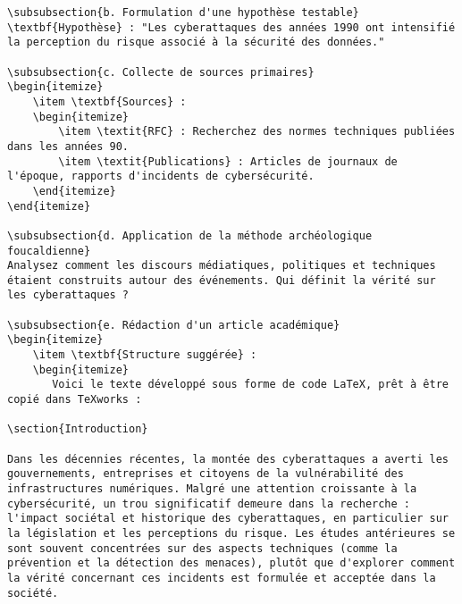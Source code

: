 \documentclass{article}
\begin{document}
\begin{verbatim}
\subsubsection{b. Formulation d'une hypothèse testable}
\textbf{Hypothèse} : "Les cyberattaques des années 1990 ont intensifié la perception du risque associé à la sécurité des données."

\subsubsection{c. Collecte de sources primaires}
\begin{itemize}
    \item \textbf{Sources} :
    \begin{itemize}
        \item \textit{RFC} : Recherchez des normes techniques publiées dans les années 90.
        \item \textit{Publications} : Articles de journaux de l'époque, rapports d'incidents de cybersécurité.
    \end{itemize}
\end{itemize}

\subsubsection{d. Application de la méthode archéologique foucaldienne}
Analysez comment les discours médiatiques, politiques et techniques étaient construits autour des événements. Qui définit la vérité sur les cyberattaques ?

\subsubsection{e. Rédaction d'un article académique}
\begin{itemize}
    \item \textbf{Structure suggérée} :
    \begin{itemize}
       Voici le texte développé sous forme de code LaTeX, prêt à être copié dans TeXworks :

\section{Introduction}

Dans les décennies récentes, la montée des cyberattaques a averti les gouvernements, entreprises et citoyens de la vulnérabilité des infrastructures numériques. Malgré une attention croissante à la cybersécurité, un trou significatif demeure dans la recherche : l'impact sociétal et historique des cyberattaques, en particulier sur la législation et les perceptions du risque. Les études antérieures se sont souvent concentrées sur des aspects techniques (comme la prévention et la détection des menaces), plutôt que d'explorer comment la vérité concernant ces incidents est formulée et acceptée dans la société.


\end{verbatim}
\end{document}

